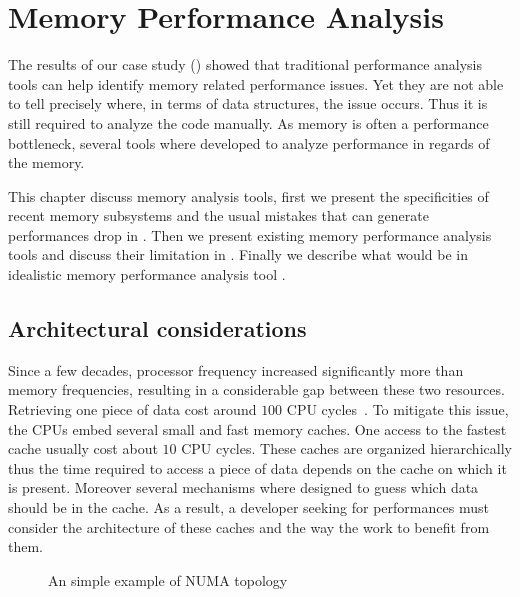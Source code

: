 \chapter{Memory Performance Analysis}

The results of our case study () showed that traditional performance analysis tools can help identify memory related performance issues.
Yet they are not able to tell precisely where, in terms of data structures, the issue occurs.
Thus it is still required to analyze the code manually.
As memory is often a performance bottleneck, several tools where developed to analyze performance in regards of the memory.

This chapter discuss memory analysis tools, first we present the specificities of recent memory subsystems and the usual mistakes that can generate performances drop in .
Then we present existing memory performance analysis tools and discuss their limitation in .
Finally we describe what would be in idealistic memory performance analysis tool .

\section{Architectural considerations}
\label{sec:archi}

Since a few decades, processor frequency increased significantly more than memory frequencies, resulting in a considerable gap between these two resources.
Retrieving one piece of data cost around $100$ \gls{CPU} cycles~\cite{Drepper07What}.
To mitigate this issue, the \glspl{CPU} embed several small and fast memory caches.
One access to the fastest cache usually cost about $10$ \gls{CPU} cycles.
These caches are organized hierarchically thus the time required to access a piece of data depends on the cache on which it is present.
Moreover several mechanisms where designed to guess which data should be in the cache.
As a result, a developer seeking for performances must consider the architecture of these caches and the way the work to benefit from them.

\begin{figure}[htb]
    \centering
    
    \caption{An simple example of NUMA topology}
    \label{fig:topo-NUMA}
\end{figure}

